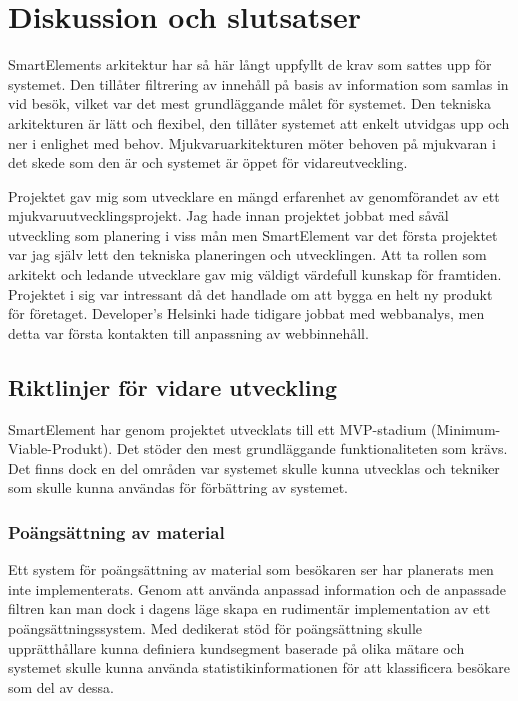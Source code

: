 \section{Diskussion och slutsatser}

SmartElements arkitektur har så här långt uppfyllt de krav som sattes upp för systemet. Den tillåter filtrering av innehåll på basis av information som samlas in vid besök, vilket var det mest grundläggande målet för systemet. Den tekniska arkitekturen är lätt och flexibel, den tillåter systemet att enkelt utvidgas upp och ner i enlighet med behov. Mjukvaruarkitekturen möter behoven på mjukvaran i det skede som den är och systemet är öppet för vidareutveckling.

Projektet gav mig som utvecklare en mängd erfarenhet av genomförandet av ett mjukvaruutvecklingsprojekt. Jag hade innan projektet jobbat med såväl utveckling som planering i viss mån men SmartElement var det första projektet var jag själv lett den tekniska planeringen och utvecklingen. Att ta rollen som arkitekt och ledande utvecklare gav mig väldigt värdefull kunskap för framtiden. Projektet i sig var intressant då det handlade om att bygga en helt ny produkt för företaget. Developer's Helsinki hade tidigare jobbat med webbanalys, men detta var första kontakten till anpassning av webbinnehåll.

\subsection{Riktlinjer för vidare utveckling}

SmartElement har genom projektet utvecklats till ett MVP-stadium (Minimum-Viable-Produkt). Det stöder den mest grundläggande funktionaliteten som krävs. Det finns dock en del områden var systemet skulle kunna utvecklas och tekniker som skulle kunna användas för förbättring av systemet.

\subsubsection{Poängsättning av material}

Ett system för poängsättning av material som besökaren ser har planerats men inte implementerats. Genom att använda anpassad information och de anpassade filtren kan man dock i dagens läge skapa en rudimentär implementation av ett poängsättningssystem. Med dedikerat stöd för poängsättning skulle upprätthållare kunna definiera kundsegment baserade på olika mätare och systemet skulle kunna använda statistikinformationen för att klassificera besökare som del av dessa.

